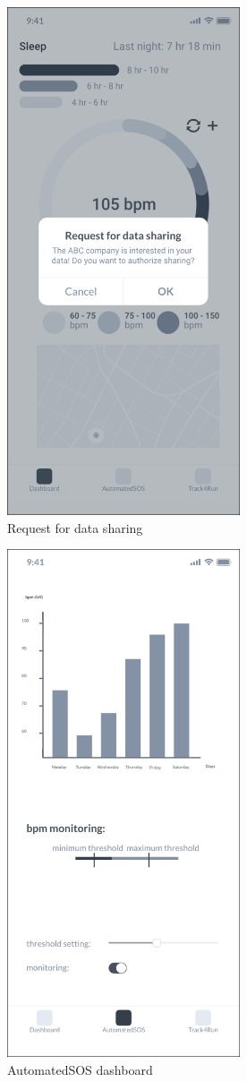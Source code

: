 \documentclass{article}
\begin{document}
	\begin{figure}[!h]
	 	\centering
		\includegraphics[height=15cm,keepaspectratio]{Figures/4DataSharing}
		\caption{Request for data sharing}
	\end{figure}\newpage
	
	\begin{figure}[!h]
	 	\centering
		\includegraphics[height=15cm,keepaspectratio]{Figures/5AutomatedSOS}
		\caption{AutomatedSOS dashboard}
	\end{figure}\newpage
	
\end{document}
